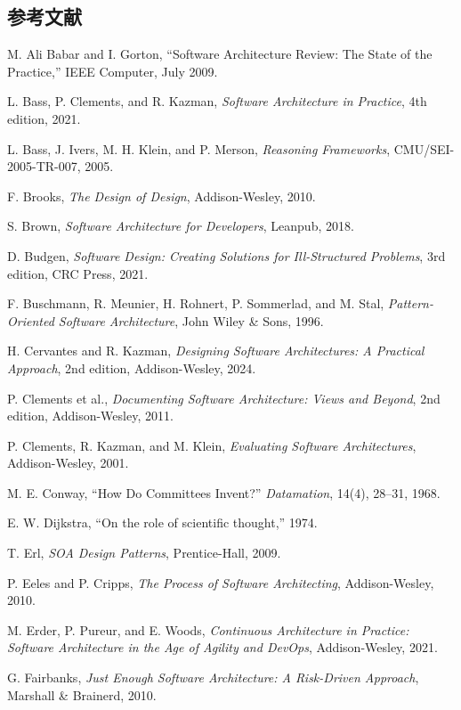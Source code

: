 \documentclass[a4paper,11pt]{ltjsarticle}
\numberwithin{figure}{section}
\numberwithin{table}{section}
\begin{document}
\subsection{参考文献}
{\small\sloppy
\begin{enumerate}[label={[\arabic*]},leftmargin=2.5em]
\item M. Ali Babar and I. Gorton, ``Software Architecture Review: The State of the Practice,'' IEEE Computer, July 2009.
\item L. Bass, P. Clements, and R. Kazman, \textit{Software Architecture in Practice}, 4th edition, 2021.
\item L. Bass, J. Ivers, M. H. Klein, and P. Merson, \textit{Reasoning Frameworks}, CMU/SEI-2005-TR-007, 2005.
\item F. Brooks, \textit{The Design of Design}, Addison-Wesley, 2010.
\item S. Brown, \textit{Software Architecture for Developers}, Leanpub, 2018.
\item D. Budgen, \textit{Software Design: Creating Solutions for Ill-Structured Problems}, 3rd edition, CRC Press, 2021.
\item F. Buschmann, R. Meunier, H. Rohnert, P. Sommerlad, and M. Stal, \textit{Pattern-Oriented Software Architecture}, John Wiley \& Sons, 1996.
\item H. Cervantes and R. Kazman, \textit{Designing Software Architectures: A Practical Approach}, 2nd edition, Addison-Wesley, 2024.
\item P. Clements et al., \textit{Documenting Software Architecture: Views and Beyond}, 2nd edition, Addison-Wesley, 2011.
\item P. Clements, R. Kazman, and M. Klein, \textit{Evaluating Software Architectures}, Addison-Wesley, 2001.
\item M. E. Conway, ``How Do Committees Invent?'' \textit{Datamation}, 14(4), 28--31, 1968.
\item E. W. Dijkstra, ``On the role of scientific thought,'' 1974.
\item T. Erl, \textit{SOA Design Patterns}, Prentice-Hall, 2009.
\item P. Eeles and P. Cripps, \textit{The Process of Software Architecting}, Addison-Wesley, 2010.
\item M. Erder, P. Pureur, and E. Woods, \textit{Continuous Architecture in Practice: Software Architecture in the Age of Agility and DevOps}, Addison-Wesley, 2021.
\item G. Fairbanks, \textit{Just Enough Software Architecture: A Risk-Driven Approach}, Marshall \& Brainerd, 2010.

\end{enumerate}}
\end{document}
